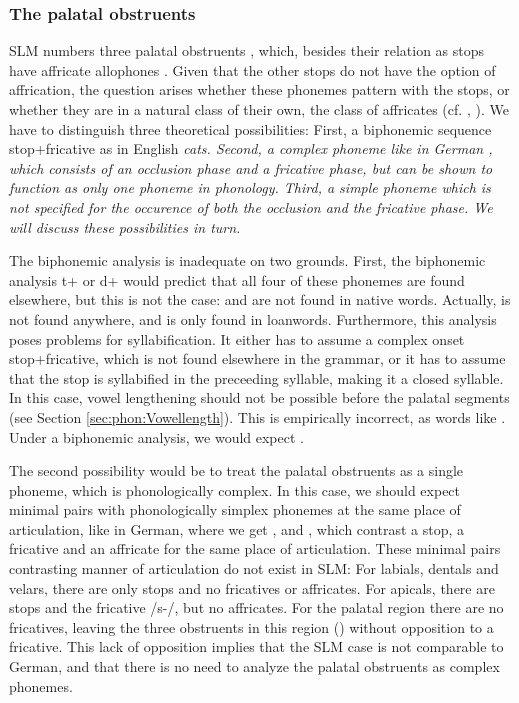 \subsubsection{The palatal obstruents}\label{sec:phon:Thepalatalobstruents} 
SLM numbers three palatal obstruents , which, besides their relation as stops have affricate allophones \phonet{\textcttctclig,\textctdctzlig,\super{\ny}\textctdctzlig}. Given that the other stops do not have the option of affrication, the question arises whether these phonemes pattern with the stops, or whether they are in a natural class of their own, the class of affricates (cf. \citet[63]{Bichsel}, \citet[357]{Noonan2006}). We have to distinguish three theoretical possibilities: First, a biphonemic sequence stop+fricative as in English \em cats\em. Second, a complex phoneme like in German , which consists of an occlusion phase and a fricative phase, but can be shown to function as only one phoneme in phonology.
Third, a simple phoneme which is not specified for the occurence of both the occlusion and the fricative phase. We will discuss these possibilities in turn.

The biphonemic analysis is inadequate on two grounds. First, the biphonemic analysis t+\sh{} or d+\zh{} would predict that all four of these phonemes are found elsewhere, but this is not the case: \sh{} and \zh{} are not found in native words. Actually, \zh{} is not found anywhere, and \sh{} is only found in loanwords. Furthermore, this analysis poses problems for syllabification. It either has to assume a complex onset stop+fricative, which is not found elsewhere in the grammar, or it has to assume that the stop is syllabified in the preceeding syllable, making it a closed syllable. In this case, vowel lengthening should not be possible before the palatal segments (see Section \ref{sec:phon:Vowellength}). This is empirically incorrect, as words like . Under a biphonemic analysis, we would expect .

The second  possibility would be to treat the palatal obstruents as a single phoneme, which is phonologically complex. In this case, we should expect minimal pairs with phonologically simplex phonemes at the same place of articulation, like in German, where we get ,  and , which contrast a stop, a fricative and an affricate for the same place of articulation. These minimal pairs contrasting manner of articulation do not exist in SLM: For labials, dentals and velars, there are only stops and no fricatives or affricates. For apicals, there are stops and the fricative /s-/, but no affricates. For the palatal region there are no fricatives, leaving the three obstruents in this region () without opposition to a fricative. This lack of opposition implies that the SLM case is not comparable to German, and that there is no need to analyze the palatal obstruents as complex phonemes.

